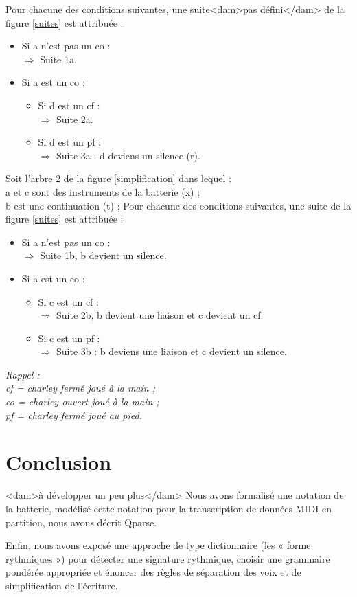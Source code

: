 Pour chacune des conditions suivantes, une suite<dam>pas défini</dam> de la
figure \ref{suites} est attribuée :
\begin{itemize}
	\item Si a n’est pas un co :\\
	$\Rightarrow$ Suite 1a.
	\item Si a est un co :
	\begin{itemize}
		\item Si d est un cf :\\
		$\Rightarrow$ Suite 2a.
		\item Si d est un pf :\\
		$\Rightarrow$ Suite 3a : d deviens un silence (r).\\
	\end{itemize}
\end{itemize}
Soit l’arbre 2 de la figure \ref{simplification} dans lequel :\\
a et c sont des instruments de la batterie (x) ;\\
b est une continuation (t) ;
Pour chacune des conditions suivantes, une suite de la figure \ref{suites} est attribuée :
\begin{itemize}
	\item Si a n’est pas un co :\\
	$\Rightarrow$ Suite 1b, b devient un silence.
	\item Si a est un co :
	\begin{itemize}
		\item Si c est un cf :\\
		$\Rightarrow$ Suite 2b, b devient une liaison et c devient un cf.
		\item Si c est un pf :\\
		$\Rightarrow$ Suite 3b : b deviens une liaison et c devient un silence.\\
	\end{itemize}
\end{itemize}
\textit{Rappel :\\cf = charley fermé joué à la main ;\\co = charley ouvert joué à la main ;\\ pf = charley fermé joué au pied.}\\

\section*{Conclusion}
<dam>à développer un peu plus</dam>
Nous avons formalisé une notation de la batterie, modélisé cette notation pour
la transcription de données MIDI en partition, nous avons décrit Qparse.

Enfin, nous avons exposé une approche de type dictionnaire (les « forme
rythmiques ») pour détecter une signature rythmique, choisir une grammaire
pondérée appropriée et énoncer des règles de séparation des voix et de
simplification de l’écriture.
